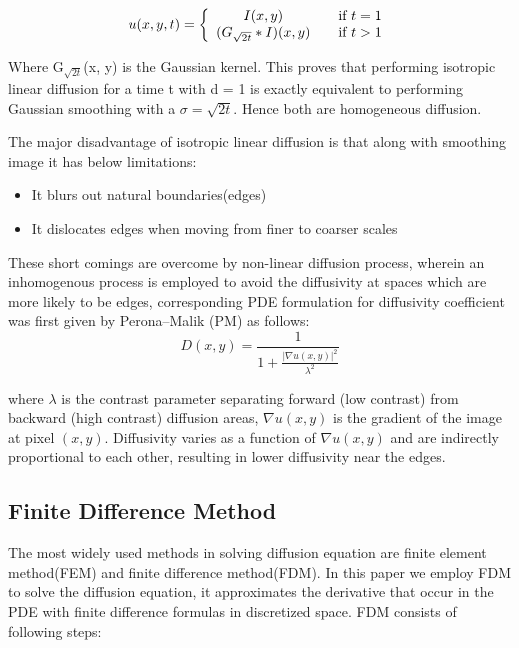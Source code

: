 \documentclass{ipol}
\begin{document}
\begin{displaymath}
u(x,y,t) =
\left\{ 
  \begin{array}{ c l }
    I(x,y) & \quad \textrm{if } t=1 \\
    (G_{\sqrt {2t }} * I)(x,y)                 & \quad \textrm{if }t > 1
  \end{array}
\right.
\end{displaymath}

Where G$_{\sqrt {2t }}$(x, y) is the Gaussian kernel. This proves that performing
isotropic linear diffusion for a time t with d = 1 is exactly equivalent to performing Gaussian smoothing with a $\sigma =\sqrt {2t }$. Hence both are homogeneous diffusion.

The major disadvantage of isotropic linear diffusion is that along with smoothing image it has below limitations\cite{Weickert1998}:
\begin{itemize}
\item
It blurs out natural boundaries(edges)
\item
It dislocates edges when moving from finer to coarser scales
\end{itemize}

These short comings are overcome by non-linear diffusion process\cite{Weickert1998}, wherein an inhomogenous process is employed to avoid the diffusivity at spaces which are more likely to be edges, corresponding PDE formulation for diffusivity coefficient was first given by Perona–Malik (PM) \cite{Perona1990} as follows:
\begin{displaymath}
D(x,y) = \frac{1}{1+\frac{\left| \nabla u\left( {x,y} \right) \right|^2}{\lambda^2}}
\end{displaymath}

where $\lambda$ is the contrast parameter separating forward (low contrast) from backward (high contrast) diffusion areas, $\nabla u\left( {x,y} \right)$ is the gradient of the image at pixel $\left( {x,y} \right)$. Diffusivity varies as a function of  $\nabla u\left( {x,y} \right)$ and are indirectly proportional to each other, resulting in lower diffusivity near the edges\cite{Weeratunga2002}.



\subsection{Finite Difference Method}

The most widely used methods in solving diffusion equation are finite element method(FEM) and finite difference method(FDM)\cite{Chung2001}. In this paper we employ FDM to solve the diffusion equation, it approximates the derivative that occur in the PDE with finite difference formulas in discretized space.\cite{Langtangen2017} FDM consists of  following steps\cite{PetterLangtangen2016}:
\end{document}

